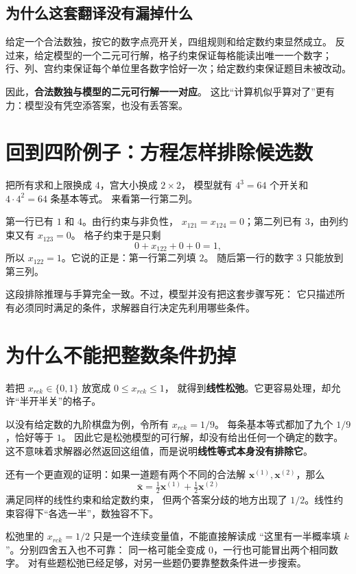 \documentclass[UTF8,11pt,fontset=none]{ctexart}
\begin{document}
\subsection{为什么这套翻译没有漏掉什么}
给定一个合法数独，按它的数字点亮开关，四组规则和给定数约束显然成立。
反过来，给定模型的一个二元可行解，格子约束保证每格能读出唯一一个数字；
行、列、宫约束保证每个单位里各数字恰好一次；给定数约束保证题目未被改动。

因此，\textbf{合法数独与模型的二元可行解一一对应}。
这比“计算机似乎算对了”更有力：模型没有凭空添答案，也没有丢答案。

\section{回到四阶例子：方程怎样排除候选数}
把所有求和上限换成 $4$，宫大小换成 $2\times2$，
模型就有 $4^3=64$ 个开关和 $4\cdot4^2=64$ 条基本等式。
来看第一行第二列。

第一行已有 $1$ 和 $4$。由行约束与非负性，
$x_{121}=x_{124}=0$；第二列已有 $3$，由列约束又有 $x_{123}=0$。
格子约束于是只剩
\[
0+x_{122}+0+0=1,
\]
所以 $x_{122}=1$。它说的正是：第一行第二列填 $2$。
随后第一行的数字 $3$ 只能放到第三列。

这段排除推理与手算完全一致。不过，模型并没有把这套步骤写死：
它只描述所有必须同时满足的条件，求解器自行决定先利用哪些条件。

\section{为什么不能把整数条件扔掉}
若把 $x_{rck}\in\{0,1\}$ 放宽成 $0\le x_{rck}\le1$，
就得到\textbf{线性松弛}。它更容易处理，却允许“半开半关”的格子。

以没有给定数的九阶棋盘为例，令所有 $x_{rck}=1/9$。
每条基本等式都加了九个 $1/9$，恰好等于 $1$。
因此它是松弛模型的可行解，却没有给出任何一个确定的数字。
这不意味着求解器必然返回这组值，而是说明\textbf{线性等式本身没有排除它}。

还有一个更直观的证明：如果一道题有两个不同的合法解
$\boldsymbol{x}^{(1)},\boldsymbol{x}^{(2)}$，那么
\[
\bar{\boldsymbol{x}}=\tfrac12\boldsymbol{x}^{(1)}+
\tfrac12\boldsymbol{x}^{(2)}
\]
满足同样的线性约束和给定数约束，
但两个答案分歧的地方出现了 $1/2$。线性约束容得下“各选一半”，数独容不下。

\begin{warnbox}[分数不是候选数的概率]
松弛里的 $x_{rck}=1/2$ 只是一个连续变量值，不能直接解读成
“这里有一半概率填 $k$”。分别四舍五入也不可靠：
同一格可能全变成 $0$，一行也可能冒出两个相同数字。
对有些题松弛已经足够，对另一些题仍要靠整数条件进一步搜索。
\end{warnbox}
\end{document}
